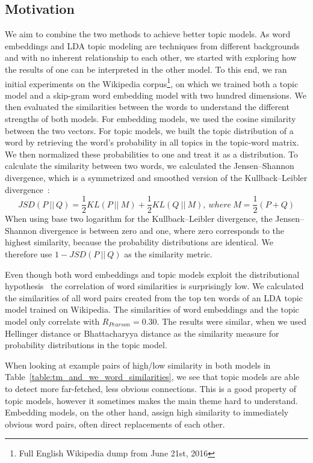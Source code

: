 \documentclass[
        a4paper,
        titlepage,
        twoside,
        parskip
        ]{scrbook}
\theoremstyle{break}
\begin{document}
\subsection{Motivation}
We aim to combine the two methods to achieve better topic models.
As word embeddings and LDA topic modeling are techniques from different backgrounds and with no inherent relationship to each other, we started with exploring how the results of one can be interpreted in the other model.
To this end, we ran initial experiments on the Wikipedia corpus\footnote{Full English Wikipedia dump from June 21st, 2016}, on which we trained both a topic model and a skip-gram word embedding model with two hundred dimensions.
We then evaluated the similarities between the words to understand the different strengths of both models.
For embedding models, we used the cosine similarity between the two vectors.
For topic models, we built the topic distribution of a word by retrieving the word's probability in all topics in the topic-word matrix.
We then normalized these probabilities to one and treat it as a distribution.
To calculate the similarity between two words, we calculated the Jensen--Shannon divergence, which is a symmetrized and smoothed version of the Kullback--Leibler divergence~\cite{Kullback1951}:
\begin{equation*}
  JSD(P~||~Q) = \frac{1}{2} KL(P~||~M) + \frac{1}{2} KL(Q~||~M),~where~M = \frac{1}{2} ( P + Q)
\end{equation*}
When using base two logarithm for the Kullback--Leibler divergence, the Jensen--Shannon divergence is between zero and one, where zero corresponds to the highest similarity, because the probability distributions are identical.
We therefore use $1 - JSD(P~||~Q)$ as the similarity metric.

Even though both word embeddings and topic models exploit the distributional hypothesis~\cite{Firth1957} the correlation of word similarities is surprisingly low.
We calculated the similarities of all word pairs created from the top ten words of an LDA topic model trained on Wikipedia.
The similarities of word embeddings and the topic model only correlate with $R_{Pearson} = 0.30$.
The results were similar, when we used Hellinger distance or Bhattacharyya distance as the similarity measure for probability distributions in the topic model.

When looking at example pairs of high/low similarity in both models in Table~\ref{table:tm_and_we_word_similarities}, we see that topic models are able to detect more far-fetched, less obvious connections.
This is a good property of topic models, however it sometimes makes the main theme hard to understand.
Embedding models, on the other hand, assign high similarity to immediately obvious word pairs, often direct replacements of each other.
\end{document}
